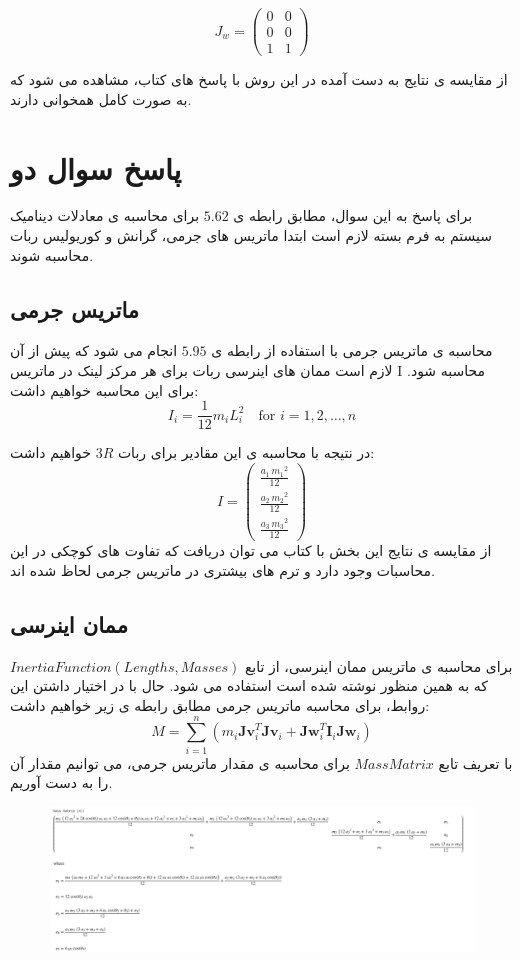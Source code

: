 \[
J_w = 
\left(\begin{array}{cc}
	0 & 0 \\
	0 & 0 \\
	1 & 1
\end{array}\right)
\]

از مقایسه ی نتایج به دست آمده در این روش با پاسخ های کتاب، مشاهده می شود که به صورت کامل همخوانی دارند.
\section*{پاسخ سوال دو}
برای پاسخ به این سوال، مطابق رابطه ی $5.62$ برای محاسبه ی معادلات دینامیک سیستم به فرم بسته لازم است ابتدا ماتریس های جرمی، گرانش و کوریولیس ربات محاسبه شوند. 
\subsection*{ماتریس جرمی}
محاسبه ی ماتریس جرمی با استفاده از رابطه ی $5.95$ انجام می شود که پیش از آن لازم است ممان های اینرسی ربات برای هر مرکز لینک در ماتریس I محاسبه شود.
برای این محاسبه خواهیم داشت:
\[
I_i = \frac{1}{12} m_i L_i^2 \quad \text{for } i = 1, 2, \ldots, n
\]

در نتیجه با محاسبه ی این مقادیر برای ربات $3R$ خواهیم داشت:
\[
I = 
\left(\begin{array}{c}
	\frac{a_1 \,{m_1 }^2 }{12} \\
	\frac{a_2 \,{m_2 }^2 }{12} \\
	\frac{a_3 \,{m_3 }^2 }{12}
\end{array}\right)
\]
از مقایسه ی نتایج این بخش با کتاب می توان دریافت که تفاوت های کوچکی در این محاسبات وجود دارد و ترم های بیشتری در ماتریس جرمی لحاظ شده اند.
\subsection*{ممان اینرسی}
برای محاسبه ی ماتریس ممان اینرسی، از تابع $Inertia Function(Lengths, Masses)$ که به همین منظور نوشته شده است استفاده می شود.
حال با در اختیار داشتن این روابط، برای محاسبه ماتریس جرمی مطابق رابطه ی زیر خواهیم داشت:
\[
M = \sum_{i=1}^{n} \left( m_i \mathbf{Jv}_i^T \mathbf{Jv}_i + \mathbf{Jw}_i^T \mathbf{I}_i \mathbf{Jw}_i \right)
\]
با تعریف تابع $Mass Matrix$ برای محاسبه ی مقدار ماتریس جرمی، می توانیم مقدار آن را به دست آوریم. 
\begin{figure}[!h]
	\centering
	\includegraphics[width=1\linewidth]{../img/screenshot001}
	\caption{}
	\label{fig:screenshot001}
\end{figure}
